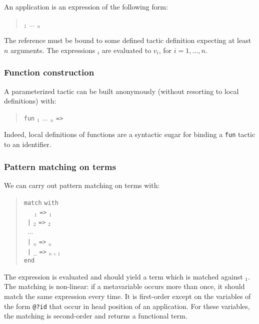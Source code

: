 An application is an expression of the following form:
\begin{quote}
{\qualid} {\tacarg}$_1$ ... {\tacarg}$_n$
\end{quote}
The reference {\qualid} must be bound to some defined tactic
definition expecting at least $n$ arguments.  The expressions
{\tacexpr}$_i$ are evaluated to $v_i$, for $i=1,...,n$.


\subsubsection[Function construction]{Function construction
}

A parameterized tactic can be built anonymously (without resorting to
local definitions) with:
\begin{quote}
{\tt fun} {\ident${}_1$} ... {\ident${}_n$} {\tt =>} {\tacexpr}
\end{quote}
Indeed, local definitions of functions are a syntactic sugar for
binding a {\tt fun} tactic to an identifier.

\subsubsection[Pattern matching on terms]{Pattern matching on terms
}

We can carry out pattern matching on terms with:
\begin{quote}
{\tt match} {\tacexpr} {\tt with}\\
~~~{\cpattern}$_1$ {\tt =>} {\tacexpr}$_1$\\
~{\tt |} {\cpattern}$_2$ {\tt =>} {\tacexpr}$_2$\\
~...\\
~{\tt |} {\cpattern}$_n$ {\tt =>} {\tacexpr}$_n$\\
~{\tt |} {\tt \_} {\tt =>} {\tacexpr}$_{n+1}$\\
{\tt end}
\end{quote}
The expression {\tacexpr} is evaluated and should yield a term which
is matched against {\cpattern}$_1$. The matching is non-linear: if a
metavariable occurs more than once, it should match the same
expression every time. It is first-order except on the
variables of the form {\tt @?id} that occur in head position of an
application. For these variables, the matching is second-order and
returns a functional term.

